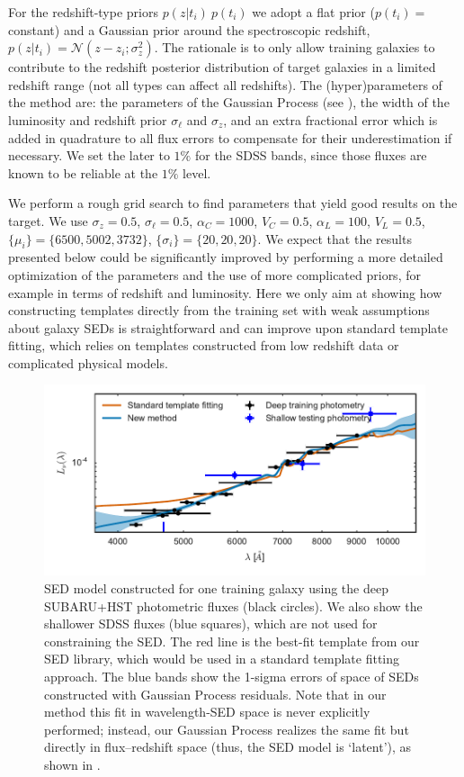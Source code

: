 \documentclass[aps,prd,showpacs,superscriptaddress,groupedaddress]{revtex4}  %
\begin{document}
For the redshift-type priors $p(z | t_i) \ p(t_i)$ we adopt a flat prior ($ p(t_i) = $ constant) and a Gaussian prior around the spectroscopic redshift, $p(z | t_i) = \mathcal{N}(z-z_i; \sigma^2_z)$.
The rationale is to only allow training galaxies to contribute to the redshift posterior distribution of target galaxies in a limited redshift range (\ie not all types can affect all redshifts).
The (hyper)parameters of the method are: the parameters of the Gaussian Process (see ), the width of the luminosity and redshift prior $\sigma_\ell$ and $\sigma_z$,  and an extra fractional error which is added in quadrature to all flux errors to compensate for their underestimation if necessary.
We set the later to $1\%$ for the SDSS bands, since those fluxes are known to be reliable at the $1\%$ level.

We perform a rough grid search to find parameters that yield good results on the target.
We use
$\sigma_z = 0.5$, 
$\sigma_\ell = 0.5$,
$\alpha_C= 1000$,
$V_C= 0.5$,
$\alpha_L= 100$,
$V_L= 0.5$,
$\{\mu_i\} = \{ 6500, 5002, 3732 \}$,
$\{\sigma_i\} = \{ 20, 20, 20 \}$.
We expect that the results presented below could be significantly improved by performing a more detailed optimization of the parameters and the use of more complicated priors, for example in terms of redshift and luminosity.
Here we only aim at showing how constructing templates directly from the training set with weak assumptions about galaxy SEDs is straightforward and can improve upon standard template fitting, which relies on templates constructed from low redshift data or complicated physical models.



\begin{figure}
\includegraphics[width=12cm]{traininggalaxy_fnulambda-6.pdf}
\caption{SED model constructed for one training galaxy using the deep SUBARU+HST photometric fluxes (black circles). We also show the shallower SDSS fluxes (blue squares), which are not used for constraining the SED. The red line is the best-fit template from our SED library, which would be used in a standard template fitting approach. The blue bands show the 1-sigma errors of space of SEDs constructed with Gaussian Process residuals. Note that in our method this fit in wavelength-SED space is never explicitly performed; instead, our Gaussian Process realizes the same fit but directly in flux--redshift space (thus, the SED model is `latent'), as shown in .}
\label{fig:traininggalaxy_fnulambda}
\end{figure}
\end{document}
